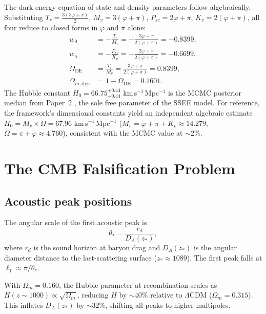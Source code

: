 \documentclass[12pt,a4paper]{article}
\begin{document}
The dark energy equation of state and density parameters follow algebraically.
Substituting $T_r=\tfrac{3(3\varphi+\pi)}{2}$, $M_v=3(\varphi+\pi)$,
$P_{sc}=2\varphi+\pi$, $K_v=2(\varphi+\pi)$, all four reduce to
closed forms in $\varphi$ and $\pi$ alone:
\begin{align}
w_0 &= -\frac{T_r}{M_v} = -\frac{3\varphi+\pi}{2(\varphi+\pi)} = -0.8399, \label{eq:w0}\\
w_a &= -\frac{P_{sc}}{K_v} = -\frac{2\varphi+\pi}{2(\varphi+\pi)} = -0.6699, \label{eq:wa}\\
\Omega_{\mathrm{DE}} &= \frac{T_r}{M_v} = \frac{3\varphi+\pi}{2(\varphi+\pi)} = 0.8399, \label{eq:OmDE}\\
\Omega_{m,\mathrm{dyn}} &= 1 - \Omega_{\mathrm{DE}} = 0.1601. \label{eq:Omm}
\end{align}
The Hubble constant $H_0=66.75^{+0.44}_{-0.44}$ km\,s$^{-1}$\,Mpc$^{-1}$
is the MCMC posterior median from Paper~2 \citep{AlmeidaSSEE2026a},
the sole free parameter of the SSEE model.
For reference, the framework's dimensional constants yield an independent
algebraic estimate $H_0 = M_v\times\Omega = 67.96$ km\,s$^{-1}$\,Mpc$^{-1}$
($M_v = \varphi+\pi+K_v \approx 14.279$, $\Omega=\pi+\varphi\approx4.760$),
consistent with the MCMC value at $\sim$2\%.

\section{The CMB Falsification Problem}
\label{sec:problem}

\subsection{Acoustic peak positions}

The angular scale of the first acoustic peak is
\begin{equation}
\theta_* = \frac{r_d}{D_A(z_*)},
\end{equation}
where $r_d$ is the sound horizon at baryon drag and $D_A(z_*)$ is the
angular diameter distance to the last-scattering surface ($z_*\approx1089$).
The first peak falls at $\ell_1 \approx \pi/\theta_*$.

With $\Omega_m=0.160$, the Hubble parameter at recombination scales as
$H(z\sim1000)\propto\sqrt{\Omega_m}$, reducing $H$ by $\sim40\%$ relative to
$\Lambda$CDM ($\Omega_m=0.315$).
This inflates $D_A(z_*)$ by $\sim32\%$, shifting all peaks to higher multipoles.
\end{document}
